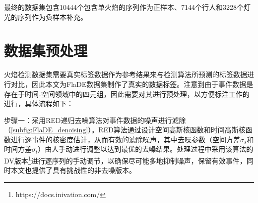 最终的数据集包含10444个包含单火焰的序列作为正样本、7144个行人和3228个灯光的序列作为负样本补充。

\section{数据集预处理}
火焰检测数据集需要真实标签数据作为参考结果来与检测算法所预测的标签数据进行对比，因此本文为FlaDE数据集制作了真实的数据标签。注意到由于事件数据是存在于时间-空间领域中的四元组，因此需要对其进行预处理，以方便标注工作的进行，具体流程如下：

步骤一：采用RED递归去噪算法\cite{ding2023}对事件数据的噪声进行滤除（\ref{subfig:FlaDE_denoising}）。RED算法通过设计空间高斯核函数和时间高斯核函数进行逐事件的核密度估计，从而有效的滤除噪声，其中去噪参数（空间方差$\sigma_s$和时间方差$\sigma_t$）由人手动进行调整以达到最优的去噪结果。处理过程中采用该算法的DV版本\footnote{https://docs.inivation.com/}进行逐序列的手动调节，以确保尽可能多地抑制噪声，保留有效事件，同时本文也提供了具有挑战性的非去噪版本。

